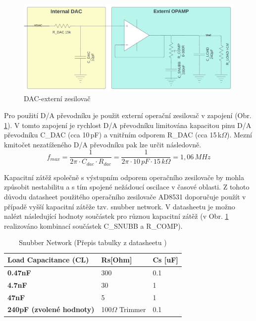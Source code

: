     \begin{figure}[ht!]
        \centering
        \includegraphics[width = 1\textwidth]{obrazky/DAC_OPAMP.png}
        \caption{DAC-externí zesilovač}
        \label{fig: DAC-externí zesilovač}
        
    \end{figure}

    Pro použití D/A převodníku je použit externí operační zesilovač v zapojení (Obr. \ref{fig: DAC-externí zesilovač}).
    V tomto zapojení je rychlost D/A převodníku limitována kapacitou pinu D/A převodníku C\_DAC (cca 10\,pF)
    a vnitřním odporem R\_DAC (cca 15\,k$\Omega$). Mezní kmitočet nezatíženého D/A převodníku pak lze určit následovně.
    \begin{equation}
        f_{max} = \frac{1}{2\pi \cdot  C_{dac} \cdot  R_{dac}} = \frac{1}{2\pi \cdot 10\,pF \cdot 15\,k\Omega} = 1,06\,MHz
    \end{equation}

    Kapacitní zátěž společně s výstupním odporem operačního zesilovače by mohla
    způsobit nestabilitu a s tím spojené nežádoucí oscilace v časové oblasti.
    Z tohoto důvodu datasheet použitého operačního zesilovače AD8531 doporučuje použít v případě vyšší kapacitní zátěže tzv. snubber network.
    V datasheetu je možno nalézt následující hodnoty součástek pro různou kapacitní zátěž (v Obr. \ref{fig: DAC-externí zesilovač} realizováno
    kombinací součástek C\_SNUBB a R\_COMP).

    \begin{table}[ht!]
        \centering
        \begin{tabular}{|l|l|l|}
        \hline
        \textbf{Load Capacitance (CL)} & \textbf{Rs{[}Ohm{]}} & \textbf{Cs {[}uF{]}} \\ \hline
        \textbf{0.47nF}                & 300                  & 0.1                  \\ \hline
        \textbf{4.7nF}                 & 30                   & 1                    \\ \hline
        \textbf{47nF}                  & 5                    & 1                    \\ \hline
        \textbf{240pF (zvolené hodnoty)}                  &100$\Omega$ Trimmer        & 0.1                      \\ \hline
        \end{tabular}%

        \caption{Snubber Network (Přepis tabulky z datasheetu \cite{OPA_datasheet})}
        \label{tab:SnubberNetwork}
    \end{table}

